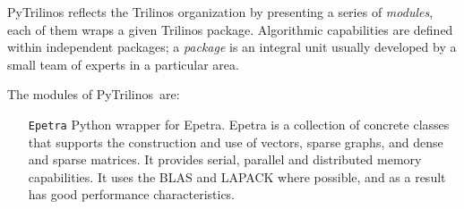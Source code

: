 \documentclass[10pt,relax]{SANDreport}
\newcommand{\PyTrilinos}{{PyTrilinos}}
\begin{document}
PyTrilinos reflects the Trilinos organization by presenting
a series of {\sl modules}, each of them wraps a given Trilinos package.
Algorithmic capabilities are defined within independent packages; a {\sl
  package} is an integral unit usually developed by a small team of experts in
  a particular area. 

The modules of \PyTrilinos\ are:
\begin{itemize}
\item[\tt Epetra] Python wrapper for Epetra. Epetra is a collection
of concrete classes that supports the construction and use of vectors, sparse
graphs, and dense and sparse matrices. It provides serial, parallel and
distributed memory capabilities. It uses the BLAS and LAPACK where possible,
  and as a result has good performance characteristics.


\end{itemize}
\end{document}
